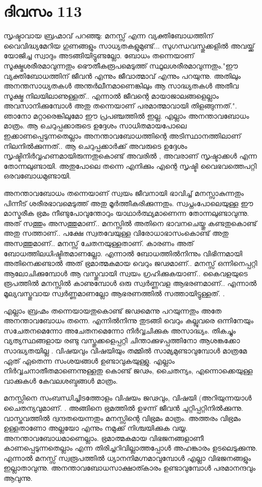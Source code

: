 \newpage
\section{ദിവസം 113}


സൃഷ്ടാവായ ബ്രഹ്മാവ്‌ പറഞ്ഞു: മനസ്സ്‌ എന്ന വ്യക്തിബോധത്തിന്‌ വൈവിദ്ധ്യമേറിയ ഗുണങ്ങളും സാധ്യതകളുമുണ്ട്‌... സുഗന്ധവസ്തുക്കളില്‍ അവയ്ക്ക്  യോജിച്ച സ്വാദും അടങ്ങിയിട്ടുണ്ടല്ലോ. ബോധം തന്നെയാണ്‌ സൂക്ഷ്മശരീരമാവുന്നതും ഭൌതീകരൂപമെടുത്ത്‌ സ്ഥൂലശരീരമാവുന്നതും."ഈ വ്യക്തിബോധത്തിന്‌ ജീവന്‍ എന്നും ജീവാത്മാവ്‌ എന്നും പറയുന്നു. അതിലും അനന്തസാധ്യതകള്‍ അന്തര്‍ലീനമാണെങ്കിലും ആ സാദ്ധ്യതകള്‍ അതീവ സൂക്ഷ്മ നിലയിലാണുള്ളത്‌.. എന്നാല്‍ ജീവന്റെ മായാജാലങ്ങളെല്ലാം അവസാനിക്കുമ്പോള്‍ അതു തന്നെയാണ്‌ പരമാത്മാവായി തിളങ്ങുന്നത്‌.". ഞാനോ മറ്റാരെങ്കിലുമോ ഈ പ്രപഞ്ചത്തില്‍ ഇല്ല. എല്ലാം അനന്താവബോധം മാത്രം. ആ ചെറുപ്പക്കാരുടെ ഉദ്ദേശം സാധിതമായപോലെ ഇക്കാണപ്പെടുന്നതെല്ലാം അനന്താവബോധത്തിന്റെ അടിസ്ഥാനത്തിലാണ്‌ നിലനില്‍ക്കുന്നത്‌.. ആ ചെറുപ്പക്കാര്‍ക്ക്‌ അവരുടെ ഉദ്ദേശം സൃഷ്ടിനിര്‍വ്വഹണമായിരുന്നതുകൊണ്ട്‌ അവരില്‍ , അവരാണ്‌ സൃഷ്ടാക്കള്‍ എന്ന തോന്നലുണ്ടായി. അതുപോലെ തന്നെ എനിക്കും എന്റെ സൃഷ്ടി വൈഭവത്തെപറ്റി ഒരവബോധമുണ്ടായി.

അനന്താവബോധം തന്നെയാണ്‌ സ്വയം ജീവനായി ഭാവിച്ച്‌ മനസ്സാകുന്നതും പിന്നീട്‌ ശരീരഭാവമെടുത്ത്‌ അതു മൂര്‍ത്തീകരിക്കുന്നതും. സ്വപ്നംപോലെയുള്ള ഈ മാസ്മരീക ഭ്രമം നീണ്ടുപോവുന്തോറും യാഥാര്‍ത്ഥ്യമാണെന്ന തോന്നലുണ്ടാവുന്നു. അത്‌ സത്തും അസത്തുമാണ്‌.. മനസ്സില്‍ അതിനെ ഭാവനചെയ്തു കണ്ടതുകൊണ്ട്‌ അതു സത്താണ്‌.. പക്ഷേ സ്വതവേയുള്ള വിരോധാഭാസംകൊണ്ട്‌ അതു അസത്തുമാണ്‌.. മനസ്സ്‌ ചേതനയുള്ളതാണ്‌. കാരണം അത്‌ ബോധത്തിലധിഷ്ടിതമാണല്ലോ.  എന്നാല്‍ ബോധത്തില്‍നിന്നും വിഭിന്നമായി അതിനെക്കണ്ടാല്‍ അത്‌ ഭ്രമാത്മകമായ വെറും ജഢമാണ്‌.. മനസ്സ്‌ ഒന്നിനെപ്പറ്റി ആലോചിക്കുമ്പോള്‍ ആ വസ്തുവായി സ്വയം ഗ്രഹിക്കുകയാണ്‌.. കൈവളയുടെ രൂപത്തില്‍ മനസ്സില്‍ കാണുമ്പോള്‍ ഒരു സ്വര്‍ണ്ണവള  ആഭരണമാണ്‌.. എന്നാല്‍ മൂല്യവസ്തുവായ സ്വര്‍ണ്ണമാണല്ലോ ആഭരണത്തില്‍ സത്തായിട്ടുള്ളത്‌. .

എല്ലാം ബ്രഹ്മം തന്നെയായതുകൊണ്ട്‌ ജഢമെന്നു പറയുന്നതും അതേ അനന്താവബോധം തന്നെ. എന്നില്‍നിന്നു തുടങ്ങി വെറും കല്ലുവരെ ഒന്നിനേയും സചേതനമെന്നോ അചേതനമെന്നോ നിര്‍വ്വചിക്കുക അസാദ്ധ്യം. തികച്ചും വ്യത്യസ്ഥങ്ങളായ രണ്ടു വസ്തുക്കളെപ്പറ്റി ചിന്താക്കുഴപ്പത്തിനോ ആശങ്കക്കോ  സാദ്ധ്യതയില്ല . വിഷയവും വിഷയിയും തമ്മില്‍ സാമ്യമുണ്ടാവുമ്പോള്‍ മാത്രമേ ഏത്‌ ഏതെന്ന സംശയങ്ങള്‍ ഉണ്ടാവുകയുള്ളു. എല്ലാം നിര്‍വ്വചനാതീതമാണെന്നുള്ളതു കൊണ്ട്‌ ജഢം, ചൈതന്യം, എന്നൊക്കെയുള്ള വാക്കുകള്‍ കേവലശബ്ദങ്ങള്‍ മാത്രം.

മനസ്സിനെ സംബന്ധിച്ചിടത്തോളം വിഷയം ജഢവും, വിഷയി (അറിയുന്നയാള്‍ ചൈതന്യവുമാണ്‌. . അങ്ങിനെ ഭ്രമത്തില്‍ ഉഴന്ന് ജീവന്‍ ചുറ്റിപ്പറ്റിനില്‍ക്കുന്നു. വാസ്തവത്തില്‍ ദ്വന്ദതയെന്നതും മനസ്സിന്റെ വിഭ്രമം മാത്രം. അത്തരം വിഭ്രമം ഉള്ളതാണോ അല്ലയോ എന്നും നമുക്ക്‌ നിശ്ചയിക്കുക വയ്യ. അനന്താവബോധമാണെല്ലാം. ഭ്രമാത്മകമായ വിഭജനങ്ങളാണീ കാണപ്പെടുന്നതെല്ലാം എന്ന തിരിച്ചറിവില്ലാത്തപ്പോള്‍ അഹങ്കാരം ഉടലെടുക്കുന്നു. എന്നാല്‍ മനസ്സ്‌ സ്വരൂപത്തില്‍ ധ്യാനനിമഗ്നമാവുമ്പോള്‍ എല്ലാ വിഭജനങ്ങളും ഇല്ലാതാവുന്നു. അനന്താവബോധസാക്ഷാത്കാരം  ഉണ്ടാവുമ്പോള്‍ പരമാനന്ദവും ആവുന്നു. 

